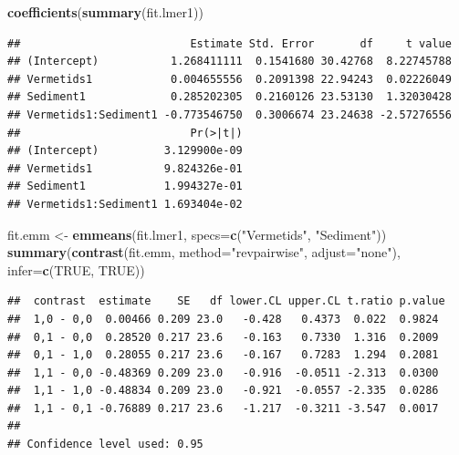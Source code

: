 \documentclass[]{book}
\newenvironment{Shaded}{\begin{snugshade}}{\end{snugshade}}
\newcommand{\KeywordTok}[1]{\textcolor[rgb]{0.13,0.29,0.53}{\textbf{#1}}}
\newcommand{\DataTypeTok}[1]{\textcolor[rgb]{0.13,0.29,0.53}{#1}}
\newcommand{\StringTok}[1]{\textcolor[rgb]{0.31,0.60,0.02}{#1}}
\newcommand{\OtherTok}[1]{\textcolor[rgb]{0.56,0.35,0.01}{#1}}
\newcommand{\NormalTok}[1]{#1}
\begin{document}
\begin{Shaded}
\begin{Highlighting}[]
\KeywordTok{coefficients}\NormalTok{(}\KeywordTok{summary}\NormalTok{(fit.lmer1))}
\end{Highlighting}
\end{Shaded}

\begin{verbatim}
##                          Estimate Std. Error       df     t value
## (Intercept)           1.268411111  0.1541680 30.42768  8.22745788
## Vermetids1            0.004655556  0.2091398 22.94243  0.02226049
## Sediment1             0.285202305  0.2160126 23.53130  1.32030428
## Vermetids1:Sediment1 -0.773546750  0.3006674 23.24638 -2.57276556
##                          Pr(>|t|)
## (Intercept)          3.129900e-09
## Vermetids1           9.824326e-01
## Sediment1            1.994327e-01
## Vermetids1:Sediment1 1.693404e-02
\end{verbatim}

\begin{Shaded}
\begin{Highlighting}[]
\NormalTok{fit.emm <-}\StringTok{ }\KeywordTok{emmeans}\NormalTok{(fit.lmer1, }\DataTypeTok{specs=}\KeywordTok{c}\NormalTok{(}\StringTok{"Vermetids"}\NormalTok{, }\StringTok{"Sediment"}\NormalTok{))}
\KeywordTok{summary}\NormalTok{(}\KeywordTok{contrast}\NormalTok{(fit.emm, }\DataTypeTok{method=}\StringTok{"revpairwise"}\NormalTok{, }\DataTypeTok{adjust=}\StringTok{"none"}\NormalTok{), }\DataTypeTok{infer=}\KeywordTok{c}\NormalTok{(}\OtherTok{TRUE}\NormalTok{, }\OtherTok{TRUE}\NormalTok{))}
\end{Highlighting}
\end{Shaded}

\begin{verbatim}
##  contrast  estimate    SE   df lower.CL upper.CL t.ratio p.value
##  1,0 - 0,0  0.00466 0.209 23.0   -0.428   0.4373  0.022  0.9824 
##  0,1 - 0,0  0.28520 0.217 23.6   -0.163   0.7330  1.316  0.2009 
##  0,1 - 1,0  0.28055 0.217 23.6   -0.167   0.7283  1.294  0.2081 
##  1,1 - 0,0 -0.48369 0.209 23.0   -0.916  -0.0511 -2.313  0.0300 
##  1,1 - 1,0 -0.48834 0.209 23.0   -0.921  -0.0557 -2.335  0.0286 
##  1,1 - 0,1 -0.76889 0.217 23.6   -1.217  -0.3211 -3.547  0.0017 
## 
## Confidence level used: 0.95
\end{verbatim}
\end{document}

